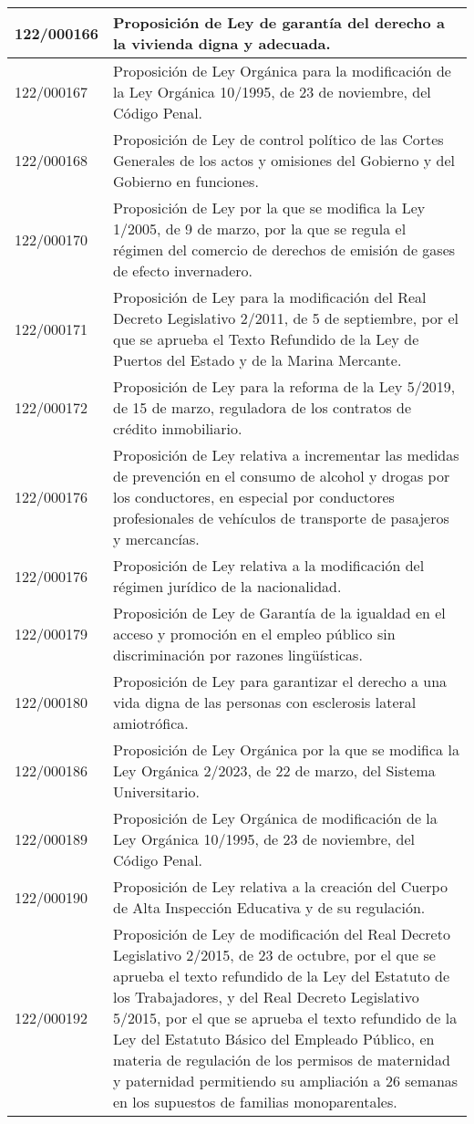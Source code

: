 {\begin{table}[H]
\begin{center}
\begin{tabularx}{\linewidth}{| l | X |}
122/000166 & Proposición de Ley de garantía del derecho a la vivienda digna y adecuada. \\
\hline
122/000167 & Proposición de Ley Orgánica para la modificación de la Ley Orgánica 10/1995, de 23 de noviembre, del Código Penal. \\
\hline
122/000168 & Proposición de Ley de control político de las Cortes Generales de los actos y omisiones del Gobierno y del Gobierno en funciones. \\
\hline
122/000170 & Proposición de Ley por la que se modifica la Ley 1/2005, de 9 de marzo, por la que se regula el régimen del comercio de derechos de emisión de gases de efecto invernadero. \\
\hline
122/000171 & Proposición de Ley para la modificación del Real Decreto Legislativo 2/2011, de 5 de septiembre, por el que se aprueba el Texto Refundido de la Ley de Puertos del Estado y de la Marina Mercante. \\
\hline
122/000172 & Proposición de Ley para la reforma de la Ley 5/2019, de 15 de marzo, reguladora de los contratos de crédito inmobiliario. \\
\hline
122/000176 & Proposición de Ley relativa a incrementar las medidas de prevención en el consumo de alcohol y drogas por los conductores, en especial por conductores profesionales de vehículos de transporte de pasajeros y mercancías. \\
\hline
122/000176 & Proposición de Ley relativa a la modificación del régimen jurídico de la nacionalidad. \\
\hline
122/000179 & Proposición de Ley de Garantía de la igualdad en el acceso y promoción en el empleo público sin discriminación por razones lingüísticas. \\
\hline
122/000180 & Proposición de Ley para garantizar el derecho a una vida digna de las personas con esclerosis lateral amiotrófica. \\
\hline
122/000186 & Proposición de Ley Orgánica por la que se modifica la Ley Orgánica 2/2023, de 22 de marzo, del Sistema Universitario. \\
\hline
122/000189 & Proposición de Ley Orgánica de modificación de la Ley Orgánica 10/1995, de 23 de noviembre, del Código Penal. \\
\hline
122/000190 & Proposición de Ley relativa a la creación del Cuerpo de Alta Inspección Educativa y de su regulación. \\
\hline
122/000192 & Proposición de Ley de modificación del Real Decreto Legislativo 2/2015, de 23 de octubre, por el que se aprueba el texto refundido de la Ley del Estatuto de los Trabajadores, y del Real Decreto Legislativo 5/2015, por el que se aprueba el texto refundido de la Ley del Estatuto Básico del Empleado Público, en materia de regulación de los permisos de maternidad y paternidad permitiendo su ampliación a 26 semanas en los supuestos de familias monoparentales. \\

\end{tabularx}
\end{center}
\end{table}}
